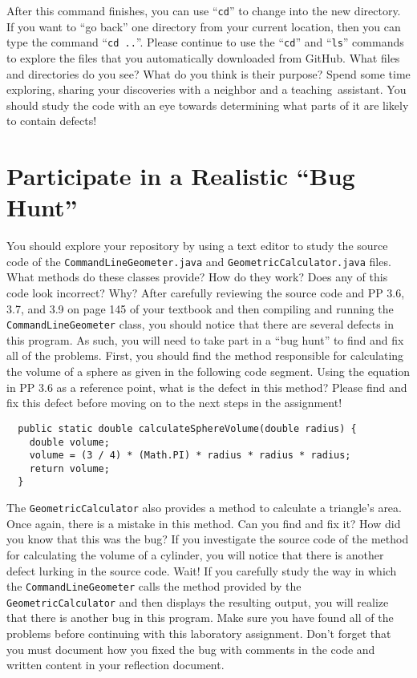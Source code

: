 \documentclass[11pt]{article}
\newcommand{\command}[1]{``\lstinline{#1}''}
\newcommand{\step}[1]{``{#1}''}
\begin{document}
After this command finishes, you can use \command{cd} to change into the new
directory. If you want to \step{go back} one directory from your current
location, then you can type the command \command{cd ..}. Please continue to use
the \command{cd} and \command{ls} commands to explore the files that you
automatically downloaded from GitHub. What files and directories do you see?
What do you think is their purpose? Spend some time exploring, sharing your
discoveries with a neighbor and a \mbox{teaching assistant}. You should study
the code with an eye towards determining what parts of it are likely to contain
defects!

\section*{Participate in a Realistic ``Bug Hunt''}

You should explore your repository by using a text editor to study the source
code of the {\tt CommandLineGeometer.java} and {\tt GeometricCalculator.java}
files. What methods do these classes provide? How do they work? Does any of this
code look incorrect? Why? After carefully reviewing the source code and PP 3.6,
3.7, and 3.9 on page 145 of your textbook and then compiling and running the
{\tt CommandLineGeometer} class, you should notice that there are several
defects in this program. As such, you will need to take part in a ``bug hunt''
to find and fix all of the problems. First, you should find the method
responsible for calculating the volume of a sphere as given in the following
code segment. Using the equation in PP 3.6 as a reference point, what is the
defect in this method? Please find and fix this defect before moving on to the
next steps in the assignment!

\vspace*{-.05in}
\begin{verbatim}
  public static double calculateSphereVolume(double radius) {
    double volume;
    volume = (3 / 4) * (Math.PI) * radius * radius * radius;
    return volume;
  }
\end{verbatim}
\vspace*{-.05in}

The {\tt GeometricCalculator} also provides a method to calculate a triangle's
area. Once again, there is a mistake in this method. Can you find and fix it?
How did you know that this was the bug? If you investigate the source code of
the method for calculating the volume of a cylinder, you will notice that there
is another defect lurking in the source code. Wait! If you carefully study the
way in which the {\tt CommandLineGeometer} calls the method provided by the {\tt
GeometricCalculator} and then displays the resulting output, you will realize
that there is another bug in this program. Make sure you have found all of the
problems before continuing with this laboratory assignment. Don't forget that
you must document how you fixed the bug with comments in the code and written
content in your reflection document.
\end{document}
